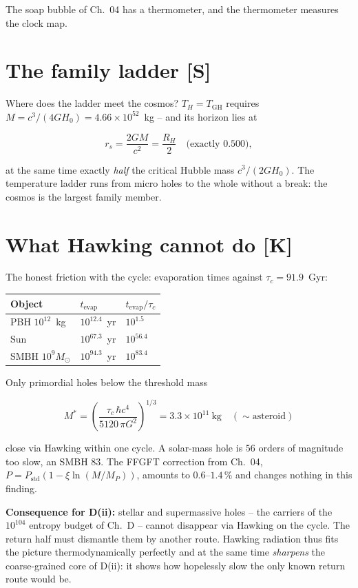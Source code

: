 \documentclass[11pt]{report}
\begin{document}
The soap bubble of Ch.~04 has a thermometer, and the thermometer
measures the clock map.

\section{The family ladder [S]}

Where does the ladder meet the cosmos? $T_H = T_\text{GH}$
requires $M = c^3/(4GH_0) = 4.66\times10^{52}$~kg -- and its
horizon lies at

\[
  r_s = \frac{2GM}{c^2} = \frac{R_H}{2} \quad\text{(exactly } 0.500\text{)},
\]

at the same time exactly \emph{half} the critical Hubble mass
$c^3/(2GH_0)$. The temperature ladder runs from micro holes to
the whole without a break: the cosmos is the largest family
member.

\section{What Hawking cannot do [K]}

The honest friction with the cycle: evaporation times against
$\tau_c = 91.9$~Gyr:

\begin{center}
\begin{tabular}{lll}
\toprule
Object & $t_\text{evap}$ & $t_\text{evap}/\tau_c$ \\
\midrule
PBH $10^{12}$~kg & $10^{12.4}$~yr & $10^{1.5}$ \\
Sun & $10^{67.3}$~yr & $10^{56.4}$ \\
SMBH $10^{9}M_\odot$ & $10^{94.3}$~yr & $10^{83.4}$ \\
\bottomrule
\end{tabular}
\end{center}

Only primordial holes below the threshold mass

\[
  M^{*} = \left(\frac{\tau_c\,\hbar c^4}{5120\,\pi G^2}\right)^{1/3}
  = 3.3\times10^{11}~\text{kg} \quad(\sim\text{asteroid})
\]

close via Hawking within one cycle. A solar-mass hole is $56$
orders of magnitude too slow, an SMBH $83$. The FFGFT correction
from Ch.~04, $P = P_\text{std}(1 - \xi\ln(M/M_P))$, amounts to
$0.6$--$1.4\,\%$ and changes nothing in this finding.

\textbf{Consequence for D(ii):} stellar and supermassive holes --
the carriers of the $10^{104}$ entropy budget of Ch.~D -- cannot
disappear via Hawking on the cycle. The return half must dismantle
them by another route. Hawking radiation thus fits the picture
thermodynamically perfectly and at the same time \emph{sharpens}
the coarse-grained core of D(ii): it shows how hopelessly slow the
only known return route would be.
\end{document}
